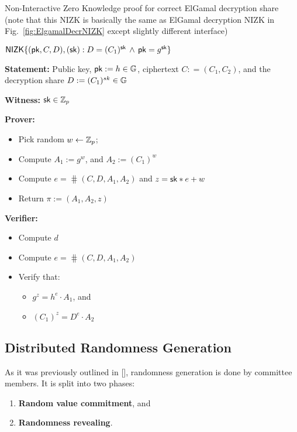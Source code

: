 \FloatBarrier
\begin{boxfig}{\label{fig:DecrShareNIZK}Non-Interactive Zero Knowledge proof for correct ElGamal decryption share (note that this NIZK is basically the same as ElGamal decryption NIZK in Fig.~\ref{fig:ElgamalDecrNIZK} except slightly different interface)}{}
\begin{center}
$\mathsf{NIZK}\{(\mathsf{pk}, C, D ),(\mathsf{sk}): D = (C_1)^{\mathsf{sk}} \, \wedge \, \mathsf{pk} = g^{\mathsf{sk}}\}$
\end{center}

\textbf{Statement:} Public key, $\mathsf{pk}:=h \in\mathbb{G}$,  ciphertext $C: =(C_1, C_2 )$, and the decryption share $D:=(C_1)^{sk} \in\mathbb{G}$

\textbf{Witness:} $\mathsf{sk}\in\mathbb{Z}_p$

\medskip
\textbf{Prover:}
\begin{itemize}
\item Pick random $w \leftarrow  {\mathbb{Z}_p}$; 
\item Compute $A_1 := g^w$, and $A_2 := (C_1)^w $
\item Compute $e = \hash(C,D,A_1,A_2)$ and  $ z = \mathsf{sk}*e + w$
\item Return $\pi:=(A_1,A_2,z)$
\end{itemize}

\textbf{Verifier:}
\begin{itemize}
\item Compute $d$
\item Compute $e = \hash(C,D,A_1,A_2)$
\item Verify that:
    \begin{itemize}
    \item $g^z = h^e \cdot A_1$, and
    \item $(C_1)^{z} = D^e \cdot A_2$ 
    \end{itemize}
\end{itemize}
\end{boxfig}

\subsection{Distributed Randomness Generation}

As it was previously outlined in [], randomness generation is done by committee members. It is split into two phases:
\begin{enumerate}
	\item \textbf{Random value commitment}, and
	\item \textbf{Randomness revealing}.
\end{enumerate}

